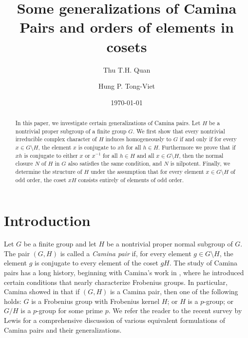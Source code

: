 \documentclass[twoside,a4paper,reqno,11pt]{amsart}
\newcommand{\<}{\langle}
\renewcommand{\>}{\rangle}
\renewcommand{\:}{\colon}
\theoremstyle{definition}
\begin{document}
\title[Camina pairs and cosets]{Some generalizations of Camina Pairs and orders of elements in cosets}


\author{Thu T.H. Quan}
\address{Thu T.H. Quan, Department of Mathematics and Statistics, Binghamton University, Binghamton, NY 13902-6000, USA}



\author{Hung P. Tong-Viet}
\address{H.P. Tong-Viet, Department of Mathematics and Statistics, Binghamton University, Binghamton, NY 13902-6000, USA}



\renewcommand{\shortauthors}{Quan, Tong-Viet}

\begin{abstract}
In this paper, we investigate certain generalizations of Camina pairs. Let $H$ be a nontrivial proper subgroup of a finite group $G$. We first show that every nontrivial irreducible complex character of $H$ induces homogeneously to $G$ if and only if for every $x\in G\setminus H$, the element $x$ is conjugate to $xh$ for all $h\in H$. Furthermore we prove that if $xh$ is conjugate to either $x$ or $x^{-1}$ for all $h\in H$ and all $x\in G\setminus H$, then the normal closure $N$ of $H$ in $G$ also satisfies the same condition, and $N$ is nilpotent. Finally, we determine the structure of $H$ under the assumption that for every element $x\in G\setminus H$ of odd order, the coset $xH$ consists entirely of elements of odd order.
\end{abstract}

\date{\today}

\maketitle


\section{Introduction}\label{s:intro}
Let $G$ be a finite group and let $H$  be a nontrivial proper normal subgroup of $G$. The pair $(G,H)$ is called a \emph{Camina pair} if, for every element $g\in G\setminus H$, the element $g$ is conjugate to every element of the coset $gH$. The study of Camina pairs has a long history, beginning with Camina's work in \cite{Camina}, where he introduced certain conditions that nearly characterize Frobenius groups. In particular, Camina showed in  \cite[Theorem 2]{Camina} that if $(G,H)$ is a Camina pair, then one of the following holds:  $G$ is a Frobenius group with Frobenius kernel $H$; or $H$ is a $p$-group; or $G/H$ is a $p$-group for some prime $p$. We refer the reader to the recent survey  by Lewis \cite{Lewis} for a comprehensive discussion of  various equivalent formulations of Camina pairs and their generalizations.
\end{document}
